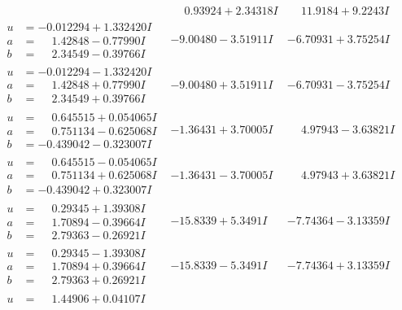\documentclass[1p]{elsarticle_modified}
\theoremstyle{definition}
\begin{document}
$$\begin{array}{c|c|c}
 & \phantom{-}0.93924 + 2.34318 I & \phantom{-}11.9184 + 9.2243 I \\ \hline\begin{aligned}
u &= -0.012294 + 1.332420 I \\
a &= \phantom{-}1.42848 - 0.77990 I \\
b &= \phantom{-}2.34549 - 0.39766 I\end{aligned}
 & -9.00480 - 3.51911 I & -6.70931 + 3.75254 I \\ \hline\begin{aligned}
u &= -0.012294 - 1.332420 I \\
a &= \phantom{-}1.42848 + 0.77990 I \\
b &= \phantom{-}2.34549 + 0.39766 I\end{aligned}
 & -9.00480 + 3.51911 I & -6.70931 - 3.75254 I \\ \hline\begin{aligned}
u &= \phantom{-}0.645515 + 0.054065 I \\
a &= \phantom{-}0.751134 - 0.625068 I \\
b &= -0.439042 - 0.323007 I\end{aligned}
 & -1.36431 + 3.70005 I & \phantom{-}4.97943 - 3.63821 I \\ \hline\begin{aligned}
u &= \phantom{-}0.645515 - 0.054065 I \\
a &= \phantom{-}0.751134 + 0.625068 I \\
b &= -0.439042 + 0.323007 I\end{aligned}
 & -1.36431 - 3.70005 I & \phantom{-}4.97943 + 3.63821 I \\ \hline\begin{aligned}
u &= \phantom{-}0.29345 + 1.39308 I \\
a &= \phantom{-}1.70894 - 0.39664 I \\
b &= \phantom{-}2.79363 - 0.26921 I\end{aligned}
 & -15.8339 + 5.3491 I & -7.74364 - 3.13359 I \\ \hline\begin{aligned}
u &= \phantom{-}0.29345 - 1.39308 I \\
a &= \phantom{-}1.70894 + 0.39664 I \\
b &= \phantom{-}2.79363 + 0.26921 I\end{aligned}
 & -15.8339 - 5.3491 I & -7.74364 + 3.13359 I \\ \hline\begin{aligned}
u &= \phantom{-}1.44906 + 0.04107 I \\

\end{aligned}
\end{array}$$
\end{document}
